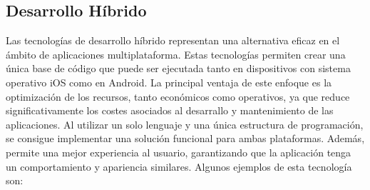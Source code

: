 \documentclass{article}
\begin{document}
\subsection{Desarrollo Híbrido}
Las tecnologías de desarrollo híbrido representan una alternativa eficaz en el ámbito de aplicaciones multiplataforma. Estas tecnologías permiten crear una única 
base de código que puede ser ejecutada tanto en dispositivos con sistema operativo iOS como en Android. La principal ventaja de este enfoque es la optimización de los recursos,
tanto económicos como operativos, ya que reduce significativamente los costes asociados al desarrallo y mantenimiento de las aplicaciones. Al utilizar un solo lenguaje y una 
única estructura de programación, se consigue implementar una solución funcional para ambas plataformas. Además, permite una mejor experiencia al usuario, garantizando que la aplicación
tenga un comportamiento y apariencia similares. Algunos ejemplos de esta tecnología son:
\end{document}
